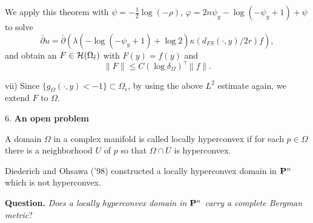 \documentclass[12pt]{article}
\begin{document}
\bigskip

We apply this theorem with
$\psi=-\frac12\log(-\rho),\,\varphi=2n\psi_y-\log(-\psi_y+1)+\psi$
to solve
$$
\bar{\partial}u=\bar{\partial}(\lambda \left( -\log
(-\psi_y+1)+\log 2\right) \kappa (d_{FS}(\cdot,y)/2r)f),
$$
and obtain an $F\in {\cal H}(\Omega_{\tilde{\epsilon}})$ with
$F(y)=f(y)$ and
$$
\|F\|\le C(\log\delta_\Omega)^\gamma \|f\|.
$$

\bigskip


vii) Since $\{g_\Omega(\cdot,y)<-1\}\subset
\Omega_{\tilde{\epsilon}}$, by using the above $L^2$ estimate
again, we extend $F$ to $\Omega$.

\bigskip

6. \textbf{An open problem}

\bigskip

A domain $\Omega$ in a complex manifold is called locally
hyperconvex if for each $p\in \Omega$ there is a neighborhood $U$
of $p$ so that $\Omega\cap U$ is hyperconvex.

Diederich and Ohsawa ('98) constructed a locally hyperconvex
domain in ${\bf P}^n$ which is not hyperconvex.

\bigskip

\textbf{Question.} \emph{Does a locally hyperconvex domain in
${\bf P}^n$ carry a complete Bergman metric}?
\end{document}
